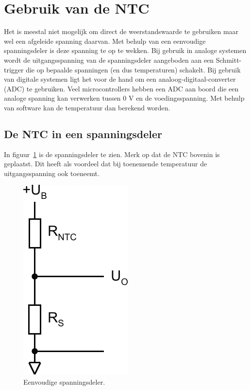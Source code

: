 \documentclass[12pt,a4paper,final,twoside,fleqn]{article}
\begin{document}
\clearpage
\section{Gebruik van de NTC}

Het is meestal niet mogelijk om direct de weerstandswaarde te gebruiken maar
wel een afgeleide spanning daarvan. Met behulp van een eenvoudige spanningsdeler
is deze spanning te op te wekken. Bij gebruik in analoge systemen wordt de
uitgangsspanning van de spanningsdeler aangeboden aan een Schmitt-trigger die op
bepaalde spanningen (en dus temperaturen) schakelt.
Bij gebruik van digitale systemen ligt het voor de hand
om een analoog-digitaal-converter (ADC) te gebruiken. Veel microcontrollers hebben
een ADC aan boord die een analoge spanning kan verwerken tussen 0 V en de
voedingsspanning. Met behulp van software kan de temperatuur dan berekend worden.

\subsection{De NTC in een spanningsdeler}
In figuur~\ref{fig:ntc_voltagediv} is de spanningsdeler te zien. Merk op dat
de NTC bovenin is geplaatst. Dit heeft als voordeel dat bij toenemende temperatuur
de uitgangsspanning ook toeneemt.

\begin{figure}[ht!]
\centering
\includegraphics[scale=0.63]{drawings/ntc_voltagediv}
\caption[Eenvoudige spanningsdeler]{Eenvoudige spanningsdeler.}
\label{fig:ntc_voltagediv}
\end{figure}
\end{document}
